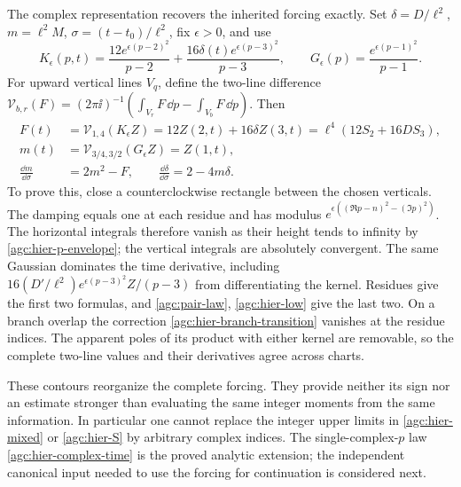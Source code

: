 The complex representation recovers the inherited forcing exactly.
Set $\delta=D/\ell^2$, $m=\ell^2M$, $\sigma=(t-t_0)/\ell^2$,
fix $\epsilon>0$, and use
\[
 K_\epsilon(p,t)=\frac{12e^{\epsilon(p-2)^2}}{p-2}
              +\frac{16\delta(t)e^{\epsilon(p-3)^2}}{p-3},
 \qquad G_\epsilon(p)=\frac{e^{\epsilon(p-1)^2}}{p-1}.
\]
For upward vertical lines $V_q$, define the two-line difference
$\mathcal V_{b,r}(F)=(2\pi\ii)^{-1}
(\int_{V_r}F\,\dd p-\int_{V_b}F\,\dd p)$. Then
\begin{equation}
 \begin{split}
 F(t)&=\mathcal V_{1,4}(K_\epsilon Z)
       =12Z(2,t)+16\delta Z(3,t)
       =\ell^4(12S_2+16DS_3),\\
 m(t)&=\mathcal V_{3/4,3/2}(G_\epsilon Z)=Z(1,t),\\
 \frac{\dd m}{\dd\sigma}&=2m^2-F,\qquad
 \frac{\dd\delta}{\dd\sigma}=2-4m\delta.
 \end{split}
 \label{agc:hier-forcing-contour}
\end{equation}
To prove this, close a counterclockwise rectangle between the chosen
verticals. The damping equals one at each residue and has modulus
$e^{\epsilon((\Re p-n)^2-(\Im p)^2)}$.
The horizontal integrals therefore vanish as their height tends
to infinity by \eqref{agc:hier-p-envelope}; the vertical integrals
are absolutely convergent. The same Gaussian dominates the time
derivative, including
$16(D'/\ell^2)e^{\epsilon(p-3)^2}Z/(p-3)$ from differentiating
the kernel. Residues give the first two formulas, and
\eqref{agc:pair-law}, \eqref{agc:hier-low} give the last two.
On a branch overlap the correction \eqref{agc:hier-branch-transition}
vanishes at the residue indices. The apparent poles of its product
with either kernel are removable, so the complete two-line values
and their derivatives agree across charts.

These contours reorganize the complete forcing. They provide neither
its sign nor an estimate stronger than evaluating the same integer
moments from the same information. In particular one cannot replace
the integer upper limits in \eqref{agc:hier-mixed} or
\eqref{agc:hier-S} by arbitrary complex indices. The single-complex-$p$
law \eqref{agc:hier-complex-time} is the proved analytic extension;
the independent canonical input needed to use the forcing for
continuation is considered next.
